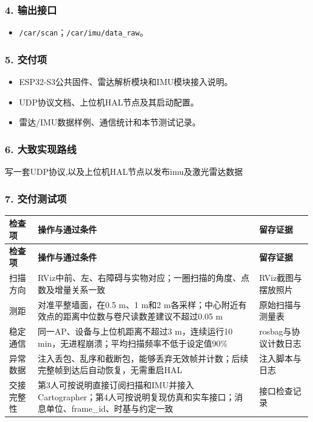 \documentclass[UTF8,fontset=fandol,11pt,a4paper]{ctexart}
\begin{document}
\subsubsection*{4. 输出接口}
\begin{itemize}
\item \nolinkurl{/car/scan}；\nolinkurl{/car/imu/data_raw}。
\end{itemize}

\subsubsection*{5. 交付项}
\begin{itemize}
\item ESP32-S3公共固件、雷达解析模块和IMU模块接入说明。
\item UDP协议文档、上位机HAL节点及其启动配置。
\item 雷达/IMU数据样例、通信统计和本节测试记录。
\end{itemize}

\subsubsection*{6. 大致实现路线}
写一套UDP协议,以及上位机HAL节点以发布imu及激光雷达数据

\subsubsection*{7. 交付测试项}
{\small
\begin{longtable}{|>{\raggedright\arraybackslash}p{}|>{\raggedright\arraybackslash}p{}|>{\raggedright\arraybackslash}p{}|}
\hline
\rowcolor{TableHead} \textbf{检查项} & \textbf{操作与通过条件} & \textbf{留存证据} \\ \hline
\endfirsthead
\hline
\rowcolor{TableHead} \textbf{检查项} & \textbf{操作与通过条件} & \textbf{留存证据} \\ \hline
\endhead
\endfoot
\endlastfoot
扫描方向 & RViz中前、左、右障碍与实物对应；一圈扫描的角度、点数及增量关系一致 & RViz截图与摆放照片 \\ \hline
测距 & 对准平整墙面，在0.5 m、1 m和2 m各采样；中心附近有效点的距离中位数与卷尺读数差建议不超过0.05 m & 原始扫描与测量表 \\ \hline
稳定通信 & 同一AP、设备与上位机距离不超过3 m，连续运行10 min，无进程崩溃；平均扫描频率不低于设定值90\% & rosbag与协议计数日志 \\ \hline
异常数据 & 注入丢包、乱序和截断包，能够丢弃无效帧并计数；后续完整帧到达后自动恢复，无需重启HAL & 注入脚本与日志 \\ \hline
交接完整性 & 第3人可按说明直接订阅扫描和IMU并接入Cartographer；第4人可按说明复现仿真和实车接口；消息单位、frame\_id、时基与约定一致 & 接口检查记录 \\ \hline
\end{longtable}
}
\end{document}
